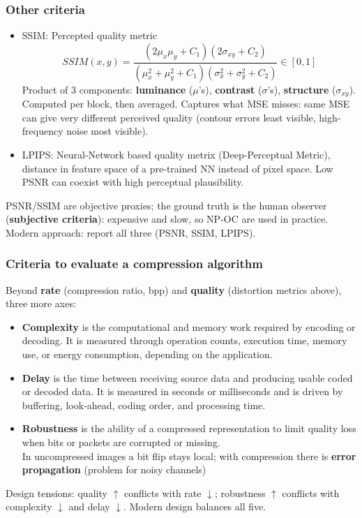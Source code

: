 \subsubsection{Other criteria}
\begin{itemize}
    \item SSIM: Percepted quality metric
    $$SSIM(x,y) = \frac{(2\mu_x\mu_y + C_1)(2\sigma_{xy}+C_2)}{(\mu_x^2+\mu_y^2+C_1)(\sigma_x^2+\sigma_y^2+C_2)} \in [0,1]$$
    Product of 3 components: \textbf{luminance} ($\mu$'s), \textbf{contrast} ($\sigma$'s), \textbf{structure} ($\sigma_{xy}$). Computed per block, then averaged. Captures what MSE misses: same MSE can give very different perceived quality (contour errors least visible, high-frequency noise most visible).
    \item LPIPS: Neural-Network based quality metrix (Deep-Perceptual Metric), distance in feature space of a pre-trained NN instead of pixel space. Low PSNR can coexist with high perceptual plausibility.
\end{itemize}
PSNR/SSIM are objective proxies; the ground truth is the human observer (\textbf{subjective criteria}): expensive and slow, so NP-OC are used in practice. Modern approach: report all three (PSNR, SSIM, LPIPS).
\subsubsection{Criteria to evaluate a compression algorithm}
Beyond \textbf{rate} (compression ratio, bpp) and \textbf{quality} (distortion metrics above), three more axes:
\begin{itemize}
    \item \textbf{Complexity} is the computational and memory work required by encoding or decoding. It is measured through operation counts, execution time, memory use, or energy consumption, depending on the application.
    \item \textbf{Delay} is the time between receiving source data and producing usable coded or decoded data. It is measured in seconds or milliseconds and is driven by buffering, look-ahead, coding order, and processing time.
    \item \textbf{Robustness} is the ability of a compressed representation to limit quality loss when bits or packets are corrupted or missing.\\
    In uncompressed images a bit flip stays local; with compression there is \textbf{error propagation} (problem for noisy channels)
\end{itemize}
Design tensions: quality $\uparrow$ conflicts with rate $\downarrow$; robustness $\uparrow$ conflicts with complexity $\downarrow$ and delay $\downarrow$. Modern design balances all five.
